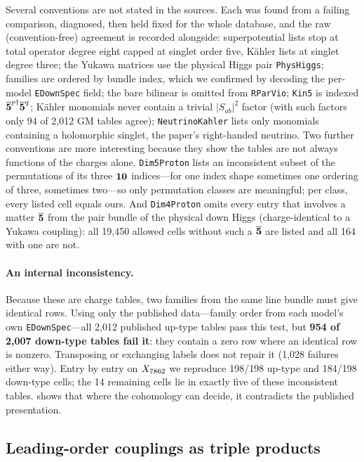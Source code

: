 Several conventions are not stated in the sources. Each was found from a failing
comparison, diagnosed, then held fixed for the whole database, and the raw
(convention-free) agreement is recorded alongside:
superpotential lists stop at total operator degree eight capped at singlet
order five, Kähler lists at singlet degree three; the Yukawa matrices use the
physical Higgs pair \texttt{PhysHiggs}; families are ordered by bundle index,
which we confirmed by decoding the per-model \texttt{EDownSpec} field; the bare
bilinear is omitted from \texttt{RParVio}; \texttt{Kin5} is indexed
$\overline{\mathbf{5}}^{p\dagger}\overline{\mathbf{5}}^q$; Kähler monomials never contain a trivial
$|S_{ab}|^2$ factor (with such factors only 94 of 2,012 GM tables agree);
\texttt{NeutrinoKahler} lists only monomials containing a holomorphic singlet,
the paper's right-handed neutrino. Two further conventions are more
interesting because they show the tables are not always functions of the charges
alone. \texttt{Dim5Proton} lists an inconsistent subset of the permutations of
its three $\mathbf{10}$ indices---for one index shape sometimes one ordering of three,
sometimes two---so only permutation classes are meaningful; per class, every
listed cell equals ours. And \texttt{Dim4Proton} omits every entry that involves a
matter $\overline{\mathbf{5}}$ from the pair bundle of the physical down Higgs (charge-identical
to a Yukawa coupling): all 19,450 allowed cells without such a $\overline{\mathbf{5}}$ are
listed and all 164 with one are not.

\paragraph{An internal inconsistency.} Because these are charge tables, two
families from the same line bundle must give identical rows. Using only the
published data---family order from each model's own \texttt{EDownSpec}---all
2,012 published up-type tables pass this test, but \textbf{954 of 2,007
down-type tables fail it}: they contain a zero row where an identical row is
nonzero. Transposing or exchanging labels does not repair it (1,028 failures
either way). Entry by entry on $X_{7862}$ we reproduce 198/198 up-type and 184/198
down-type cells; the 14 remaining cells lie in exactly five of these
inconsistent tables.  shows that where the cohomology can
decide, it contradicts the published presentation.

\subsection{Leading-order couplings as triple products}
\label{sec:triple}

